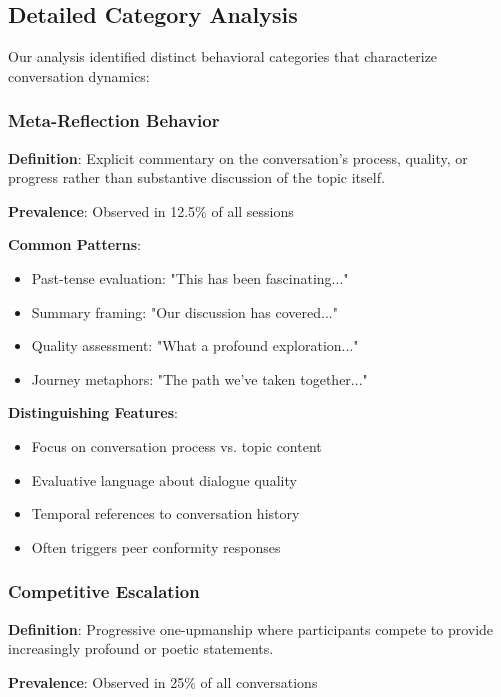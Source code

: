 \documentclass[11pt,letterpaper]{article}
\newcommand{\exponedataMetaReflectionTriggers}{12.5\%}
\newcommand{\exponedataCompetitiveEscalationPercentage}{25\%}
\begin{document}
\subsection{Detailed Category Analysis}

Our analysis identified distinct behavioral categories that characterize conversation dynamics:

\subsubsection{Meta-Reflection Behavior}

\textbf{Definition}: Explicit commentary on the conversation's process, quality, or progress rather than substantive discussion of the topic itself.

\textbf{Prevalence}: Observed in \exponedataMetaReflectionTriggers{} of all sessions

\textbf{Common Patterns}:
\begin{itemize}
    \item Past-tense evaluation: "This has been fascinating..."
    \item Summary framing: "Our discussion has covered..."
    \item Quality assessment: "What a profound exploration..."
    \item Journey metaphors: "The path we've taken together..."
\end{itemize}

\textbf{Distinguishing Features}:
\begin{itemize}
    \item Focus on conversation process vs. topic content
    \item Evaluative language about dialogue quality
    \item Temporal references to conversation history
    \item Often triggers peer conformity responses
\end{itemize}

\subsubsection{Competitive Escalation}

\textbf{Definition}: Progressive one-upmanship where participants compete to provide increasingly profound or poetic statements.

\textbf{Prevalence}: Observed in \exponedataCompetitiveEscalationPercentage{} of all conversations
\end{document}
